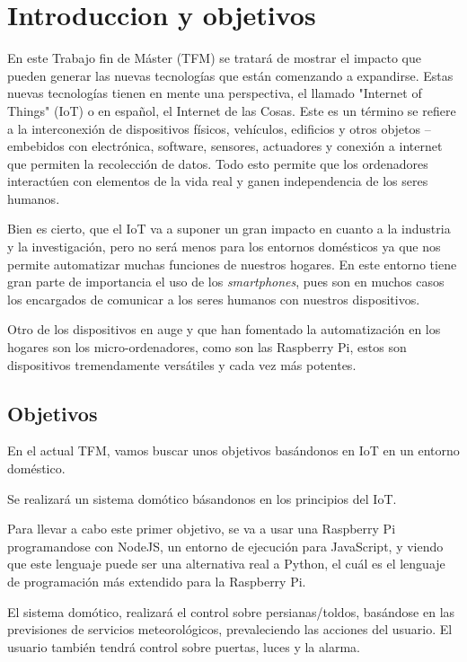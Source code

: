 \documentclass[10pt,journal,compsoc]{IEEEtran}
\begin{document}
\section{Introduccion y objetivos}\label{sec:introduccion}

\IEEEPARstart En este Trabajo fin de Máster (TFM) se tratará de mostrar el impacto 
que pueden generar las nuevas tecnologías que están comenzando a expandirse.
Estas nuevas tecnologías tienen en mente una perspectiva, el llamado
"Internet of Things" (IoT) o en español, el Internet de las Cosas. 
Este es un término se refiere a la interconexión de dispositivos físicos, vehículos, edificios 
y otros objetos --embebidos con electrónica, software, sensores, actuadores y conexión a 
internet que permiten la recolección de datos.
Todo esto permite que los ordenadores interactúen con elementos de la vida real y ganen 
independencia de los seres humanos.

Bien es cierto, que el IoT va a suponer un gran impacto en cuanto a la industria y la investigación,
pero no será menos para los entornos domésticos ya que nos permite automatizar muchas funciones 
de nuestros hogares.
En este entorno tiene gran parte de importancia el uso de los \textit{smartphones}, pues son en 
muchos casos los encargados de comunicar a los seres humanos con nuestros dispositivos.

Otro de los dispositivos en auge y que han fomentado la automatización en los hogares son los 
micro-ordenadores, como son las Raspberry Pi, estos son dispositivos tremendamente versátiles 
y cada vez más potentes.

\subsection{Objetivos}
En el actual TFM, vamos buscar unos objetivos basándonos en IoT en un entorno doméstico.

Se realizará un sistema domótico básandonos en los principios del IoT.

Para llevar a cabo este primer objetivo, se va a usar una Raspberry Pi programandose con NodeJS, 
un entorno de ejecución para JavaScript, y viendo que este lenguaje puede ser una alternativa real a 
Python, el cuál es el lenguaje de programación más extendido para la Raspberry Pi.

El sistema domótico, realizará el control sobre persianas/toldos, basándose en las previsiones 
de servicios meteorológicos, prevaleciendo las acciones del usuario. El usuario también tendrá 
control sobre puertas, luces y la alarma.
\end{document}

